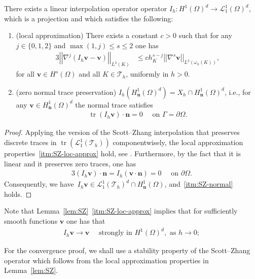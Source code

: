 \documentclass[reqno,a4paper]{amsart}
\def\norm#1{\left|\!\left| #1 \right|\!\right|}
\def\vec#1{\boldsymbol{#1}}
\def\tr{\mathop{\mathrm{tr}}\nolimits}
\def\bn{\vec{n}}
\def\bv{\vec{v}}
\def\tria{\mathcal{T}_h}
\def\PiSZ{{I_h}}
\begin{document}
\begin{lemma}\label{lem:SZ}
	There exists a linear interpolation operator operator $\PiSZ \colon H^1(\Omega)^d \to \mathcal{L}^1_1(\Omega)^d$, which is a projection and which satisfies the following:  
	\begin{enumerate}
		\item (local approximation) \label{itm:SZ-loc-approx}
		There exists a constant $c>0$ such that for any $j \in \{0,1,2\}$ and $\max(1,j) \leq  s\leq 2$ one has 
		\begin{alignat*}{3}
			\norm{\nabla^j(\PiSZ \bv - \bv)}_{L^{2}(K)} 
			&\leq c h_{K}^{s-j} \norm{\nabla^s \bv}_{L^2(\omega_h(K))}, 
		\end{alignat*}
		for all $\bv \in H^s(\Omega)$ and all $K \in \tria$, uniformly in $h>0$.
		\item (zero normal trace preservation) \label{itm:SZ-normal}
		$\PiSZ(H^1_{\bn}(\Omega)^d) = X_h \cap H^1_{\bn}(\Omega)^d $, i.e., 
		for any $\bv \in H^1_{\bn}(\Omega)^d$ the normal trace  satisfies 
		\begin{align*}
			\tr(\PiSZ \bv) \cdot \bn = 0 
			\quad \text{ on } \Gamma = \partial \Omega.
		\end{align*}
	\end{enumerate}
\end{lemma}
\begin{proof} 
	Applying the version of the Scott--Zhang interpolation that preserves discrete traces in $\tr(\mathcal{L}^1_1(\tria))$ componentwisely, the local approximation properties~\ref{itm:SZ-loc-approx} hold, see \cite[Eq.~(4.3)]{SZ.1990}.
	Furthermore, by the fact that it is linear and it  preserves zero traces, one has 
	\begin{alignat}{3}\label{eq:st-conv-testf}
		(\PiSZ \bv) \cdot \bn = \PiSZ (\bv \cdot \bn) = 0 \quad \text{ on } \partial \Omega.
	\end{alignat}
	Consequently, we have~$\PiSZ \bv  \in \mathcal{L}^1_1(\tria)^d \cap H^1_{\bn}(\Omega)$, and~\ref{itm:SZ-normal} holds. 
\end{proof}

Note that Lemma~\ref{lem:SZ}~\ref{itm:SZ-loc-approx} implies that for sufficiently smooth functions $\bv$ one has that 
\begin{align*}
	\PiSZ \bv \to  \bv \quad \text{ strongly in }  H^{1}(\Omega)^d, \text{ as } h \to 0;
\end{align*}

For the convergence proof, we shall use a stability property of the Scott--Zhang operator which follows from the local approximation properties in Lemma~\ref{lem:SZ}. 
\end{document}

